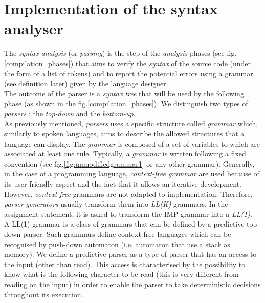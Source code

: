 \documentclass[a4paper,11pt]{article}
\begin{document}
\section{Implementation of the syntax analyser}
  The \textit{syntax analysis} (or \textit{parsing}) is the step of the \textit{analysis} phases (see fig.\ref{compilation_phases}) that aims to verify the \textit{syntax} of the source code (under the form of a list of tokens) and to report the potential errors using a grammar (see definition later) given by the language designer.\\
  The outcome of the parser is a \textit{syntax tree} that will be used by the following phase (as shown in the fig.\ref{compilation_phases}). We distinguish two types of \textit{parsers} : the \textit{top-down} and the \textit{bottom-up}.\\
  As previously mentioned, \textit{parsers} uses a specific structure called \textit{grammar} which, similarly to spoken languages, aims to describe the allowed structures that a language can display.%
  The \textit{grammar} is composed of a set of variables to which are associated at least one rule. Typically, a \textit{grammar} is written following a fixed convention (see fig.\ref{fig:unmodifiedgrammar1} or any other grammar). Generally, in the case of a programming language, \textit{context-free grammar} are used because of its user-friendly aspect and the fact that it allows an iterative development. However, \textit{context-free} grammars are not adapted to implementation. Therefore, \textit{parser generators} usually transform them into \textit{LL(K)} grammars. In the assignment statement, it is asked to transform the IMP grammar into a \textit{LL(1)}.\\
  A LL(1) grammar is a class of grammars that can be defined by a predictive top-down parser. Such grammars define context-free languages which can be recognised by push-down automaton (i.e. automaton that use a stack as memory). We define a predictive parser as a type of parser that has an access to the input (other than read). This access is characterised by the possibility to know what is the following character to be read (this is very different from reading on the input) in order to enable the parser to take deterministic decisions throughout its execution.
  
\end{document}
